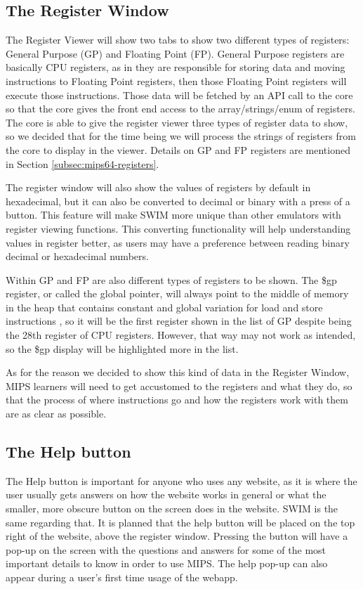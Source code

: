 \documentclass[parskip=half, fontsize=12pt]{scrartcl}
\begin{document}
\subsection{The Register Window}

The Register Viewer will show two tabs to show two different types of
registers: General Purpose (GP) and Floating Point (FP). General Purpose
registers are basically CPU registers, as in they are responsible for
storing data and moving instructions to Floating Point registers, then
those Floating Point registers will execute those instructions. Those
data will be fetched by an API call to the core so that the core gives
the front end access to the array/strings/enum of registers. The core is
able to give the register viewer three types of register data to show,
so we decided that for the time being we will process the strings of
registers from the core to display in the viewer. Details on GP and FP
registers are mentioned in Section \ref{subsec:mips64-registers}.

The register window will also show the values of registers by default in
hexadecimal, but it can also be converted to decimal or binary with a
press of a button. This feature will make SWIM more unique than other
emulators with register viewing functions. This converting functionality
will help understanding values in register better, as users may have a
preference between reading binary decimal or hexadecimal numbers.

Within GP and FP are also different types of registers to be shown. The
\$gp register, or called the global pointer, will always point to the
middle of memory in the heap that contains constant and global variation
for load and store instructions \cite{moor2009}, so it will be the first register shown
in the list of GP despite being the 28th register of CPU registers.
However, that way may not work as intended, so the \$gp display will be
highlighted more in the list.

As for the reason we decided to show this kind of data in the Register
Window, MIPS learners will need to get accustomed to the registers and
what they do, so that the process of where instructions go and how the
registers work with them are as clear as possible.

\subsection{The Help button}

The Help button is important for anyone who uses any website, as it is
where the user usually gets answers on how the website works in general
or what the smaller, more obscure button on the screen does in the
website. SWIM is the same regarding that. It is planned that the help
button will be placed on the top right of the website, above the
register window. Pressing the button will have a pop-up on the screen
with the questions and answers for some of the most important details to
know in order to use MIPS. The help pop-up can also appear during a
user's first time usage of the webapp.
\end{document}
